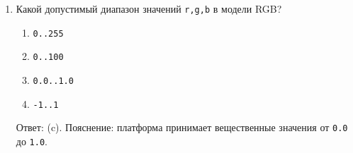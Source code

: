 \begin{enumerate}
  \item Какой допустимый диапазон значений \verb|r,g,b| в модели RGB?
  \begin{enumerate}[label=(\alph*)]
    \item \verb|0..255| \item \verb|0..100| \item \verb|0.0..1.0| \item \verb|-1..1|
  \end{enumerate}
  Ответ: (c). Пояснение: платформа принимает вещественные значения от \verb|0.0| до \verb|1.0|.
\end{enumerate}
